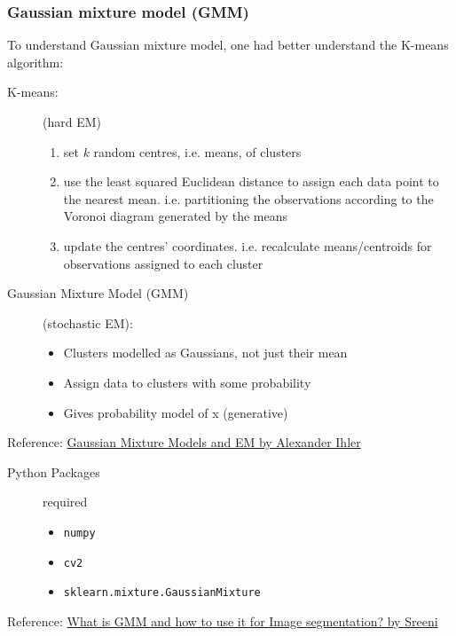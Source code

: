 \subsubsection{Gaussian mixture model (GMM)}
To understand Gaussian mixture model, one had better understand the K-means algorithm:
\begin{description}
    \item[K-means:] (hard EM)
    \begin{enumerate}
        \item set $k$ random centres, i.e. means, of clusters
        \item use the least squared Euclidean distance to assign each data point to the nearest mean. i.e. partitioning the observations according to the Voronoi diagram generated by the means
        \item update the centres' coordinates. i.e. recalculate means/centroids for observations assigned to each cluster
    \end{enumerate}

    \item[Gaussian Mixture Model (GMM)] (stochastic EM):
    \begin{itemize}
        \item Clusters modelled as Gaussians, not just their mean
        \item Assign data to clusters with some probability 
        \item Gives probability model of x (generative)
    \end{itemize}
\end{description}
Reference: \href{https://youtu.be/qMTuMa86NzU}{Gaussian Mixture Models and EM by Alexander Ihler}

\begin{description}
    \item[Python Packages] required
    \begin{itemize}
        \item \texttt{numpy}
        \item \texttt{cv2}
        \item \texttt{sklearn.mixture.GaussianMixture}
    \end{itemize}
\end{description}
Reference: \href{https://youtu.be/kkAirywakmk}{What is GMM and how to use it for Image segmentation? by Sreeni}\\

